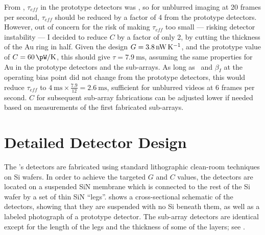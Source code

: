 From , $\tau_{eff}$ in the prototype detectors was , so for unblurred imaging at 20 frames per second, $\tau_{eff}$ should be reduced by a factor of 4 from the prototype detectors.
However, out of concern for the risk of making $\tau_{eff}$ too small --- risking detector instability --- I decided to reduce $C$ by a factor of only 2, by cutting the thickness of the Au ring in half.
Given the design $G = \SI{3.8}{\nW\per\K}$, and the prototype value of $C = \SI{60}{\pW\per\K}$, this should give $\tau = \SI{7.9}{\ms}$, assuming the same properties for Au in the prototype detectors and the sub-arrays. 
As long as \Loop\ and $\beta_I$ at the operating bias point did not change from the prototype detectors, this would reduce $\tau_{eff}$ to $\SI{4}{\ms} \times \frac{7.9}{12} = \SI{2.6}{\ms}$, sufficient for unblurred videos at 6 frames per second.
$C$ for subsequent sub-array fabrications can be adjusted lower if needed based on measurements of the first fabricated sub-arrays.

\section{Detailed Detector Design} \label{sec:ch5-det-design}

The \Imager's detectors are fabricated using standard lithographic clean-room techniques on Si wafers.
In order to achieve the targeted $G$ and $C$ values, the detectors are located on a suspended SiN membrane which is connected to the rest of the Si wafer by a set of thin SiN ``legs''.
 shows a cross-sectional schematic of the detectors, showing that they are suspended with no Si beneath them, as well as a labeled photograph of a prototype detector.
The sub-array detectors are identical except for the length of the legs and the thickness of some of the layers; see .

